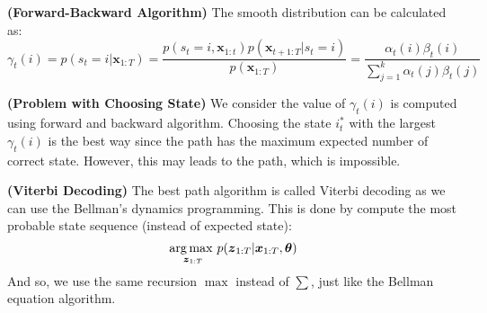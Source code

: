 \begin{definition}{\textbf{(Forward-Backward Algorithm)}}
    The smooth distribution can be calculated as:
    \begin{equation*}
        \gamma_t(i) = p(s_t = i | \boldsymbol x_{1:T}) = \frac{p(s_t = i, \boldsymbol x_{1:t})p(\boldsymbol x_{t+1:T} | s_t=i)}{p(\boldsymbol x_{1:T})} = \frac{\alpha_t(i)\beta_t(i)}{\sum^k_{j=1}\alpha_t(j)\beta_t(j)}
    \end{equation*}
\end{definition}

\begin{remark}{\textbf{(Problem with Choosing State)}}
    We consider the value of $\gamma_t(i)$ is computed using forward and backward algorithm. Choosing the state $i^*_t$ with the largest $\gamma_t(i)$ is the best way since the path has the maximum expected number of correct state. However, this may leads to the path, which is impossible.
\end{remark}

\begin{definition}{\textbf{(Viterbi Decoding)}}
    The best path algorithm is called Viterbi decoding as we can use the Bellman's dynamics programming. This is done by compute the most probable state sequence (instead of expected state):
    \begin{equation*}
        \underset{\boldsymbol z_{1:T}}{\arg\max \ } p(\boldsymbol z_{1:T} | \boldsymbol x_{1:T}, \boldsymbol \theta)
    \end{equation*}
    And so, we use the same recursion $\max$ instead of $\sum$, just like the Bellman equation algorithm. 
\end{definition}

